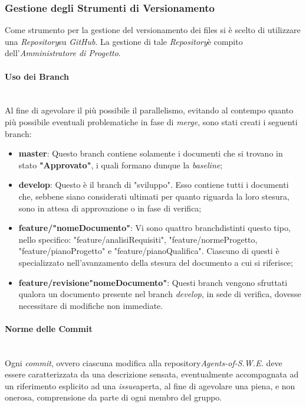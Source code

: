 \subsubsection{Gestione degli Strumenti di Versionamento}
	Come strumento per la gestione del versionamento dei files si è scelto di utilizzare una \textit{Repository}\glossario su \textit{GitHub}\glossario. La gestione di tale \textit{Repository}\glossario è compito dell'\textit{Amministratore di Progetto}.

\paragraph{Uso dei Branch} ~\\
	Al fine di agevolare il più possibile il parallelismo, evitando al contempo quanto più possibile eventuali problematiche in fase di \textit{merge}\glossario, sono stati creati i seguenti branch\glossario:
	\begin{itemize}
	\item \textbf{master}: Questo branch contiene solamente i documenti che si trovano in stato \textbf{"Approvato"}, i quali formano dunque la \textit{baseline}\glossario;
	\item \textbf{develop}: Questo è il branch di "sviluppo". Esso contiene tutti i documenti che, sebbene siano considerati ultimati per quanto riguarda la loro stesura, sono in attesa di approvazione o in fase di verifica;
	\item \textbf{feature/"nomeDocumento"}: Vi sono quattro branch\glossario distinti questo tipo, nello specifico: "feature/analisiRequisiti", "feature/normeProgetto, "feature/pianoProgetto" e "feature/pianoQualifica". Ciascuno di questi è specializzato nell'avanzamento della stesura del documento a cui si riferisce;
	\item \textbf{feature/revisione"nomeDocumento"}: Questi branch vengono sfruttati qualora un documento presente nel branch \textit{develop}, in sede di verifica, dovesse necessitare di modifiche non immediate.
	\end{itemize}

\paragraph{Norme delle Commit} ~\\
	Ogni \textit{commit}\glossario, ovvero ciascuna modifica alla repository\glossario \textit{Agents-of-S.W.E.} deve essere caratterizzata da una descrizione sensata, eventualmente accompagnata ad un riferimento esplicito ad una \textit{issue}\glossario aperta, al fine di agevolare una piena, e non onerosa, comprensione da parte di ogni membro del gruppo.

